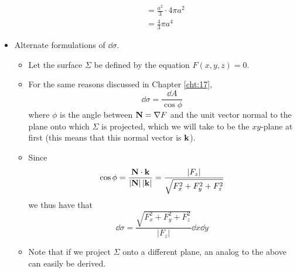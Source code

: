 \documentclass[../main.tex]{subfiles}
\begin{document}
\begin{itemize}
\begin{itemize}
\begin{align*}
            &= \frac{a^2}{3}\cdot 4\pi a^2\\
            &= \frac{4}{3}\pi a^4
        \end{align*}
    \end{itemize}
    \item Alternate formulations of $\dd{\sigma}$.
    \begin{itemize}
        \item Let the surface $\Sigma$ be defined by the equation $F(x,y,z)=0$.
        \item For the same reasons discussed in Chapter \ref{cht:17},
        \begin{equation*}
            \dd{\sigma} = \frac{\dd{A}}{\cos\phi}
        \end{equation*}
        where $\phi$ is the angle between $\vb{N}=\nabla F$ and the unit vector normal to the plane onto which $\Sigma$ is projected, which we will take to be the $xy$-plane at first (this means that this normal vector is $\vb{k}$).
        \item Since
        \begin{equation*}
            \cos\phi = \frac{\vb{N}\cdot\vb{k}}{|\vb{N}|\, |\vb{k}|} = \frac{|F_z|}{\sqrt{F_x^2+F_y^2+F_z^2}}
        \end{equation*}
        we thus have that
        \begin{equation*}
            \dd{\sigma} = \frac{\sqrt{F_x^2+F_y^2+F_z^2}}{|F_z|}\dd{x}\dd{y}
        \end{equation*}
        \item Note that if we project $\Sigma$ onto a different plane, an analog to the above can easily be derived.
    \end{itemize}
\end{itemize}
\end{document}
